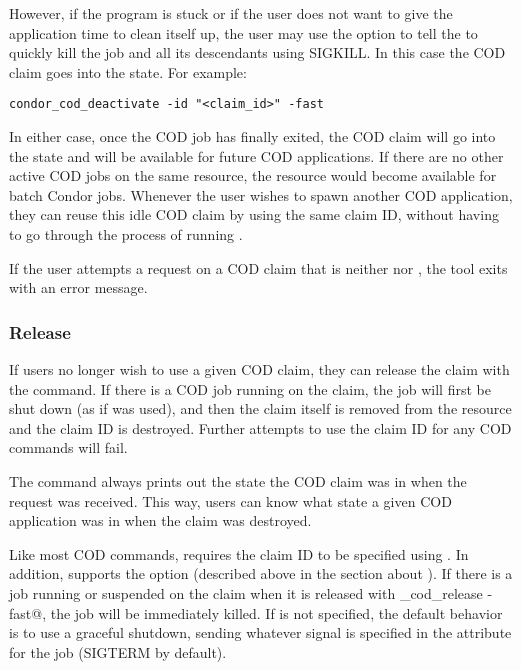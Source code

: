 However, if the program is stuck or if the user does not want to give
the application time to clean itself up, the user may use the
 option to tell the  to quickly kill the
job and all its descendants using SIGKILL.
In this case the COD claim goes into the \verb@Killing@ state.
For example:
\begin{verbatim}
condor_cod_deactivate -id "<claim_id>" -fast
\end{verbatim}

In either case, once the COD job has finally exited, the COD claim
will go into the \verb@Idle@ state and will be available for future
COD applications.
If there are no other active COD jobs on the same resource, the
resource would become available for batch Condor jobs. 
Whenever the user wishes to spawn another COD application, they can
reuse this idle COD claim by using the same claim ID, without having
to go through the process of running .

If the user attempts a  request on a COD claim
that is neither \verb@Running@ nor \verb@Suspended@, the 
tool exits with an error message.


\subsubsection{\label{sec:cod-claim-release}Release}

If users no longer wish to use a given COD claim,
they can release the claim with the  command.
If there is a COD job running on the claim,
the job will first be shut down (as if  was
used),
and then the claim itself is removed from the resource and the claim
ID is destroyed. 
Further attempts to use the claim ID for any COD commands will fail.

The  command always prints out the state the
COD claim was in when the request was received.
This way, users can know what state a given COD application was in
when the claim was destroyed.

Like most COD commands,  requires the claim ID to
be specified using .
In addition,  supports the  option
(described above in the section about ).
If there is a job running or suspended on the claim when it is
released with \verb@condor_cod_release -fast@, the job will be
immediately killed. 
If  is not specified, the default behavior is to use a
graceful shutdown, sending whatever signal is specified in the
 attribute for the job (SIGTERM by default).

